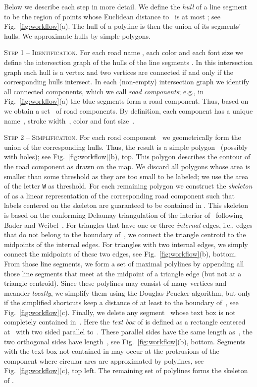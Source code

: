 \documentclass[a4paper,11pt]{article}
\begin{document}
Below we describe each step in more detail. We define the
\emph{hull} of a line segment~ to be the region of points
whose Euclidean distance to~ is at most ; see
Fig.~\ref{fig:workflow}(a). The hull of a polyline is then the union of its segments' hulls. We approximate hulls by simple polygons.

\textsc{Step 1 -- Identification.}  For each road name , each color
 and each font size  we define the intersection graph of the
hulls of the line segments . In this
intersection graph each hull is a vertex and two vertices are
connected if and only if the corresponding hulls intersect.  In each
(non-empty) intersection graph we identify all connected components,
which we call \emph{road components}; e.g., in
Fig.~\ref{fig:workflow}(a) the blue segments form a road
component. Thus, based on  we obtain a set~ of road
components. By definition, each component  has a
unique name~, stroke width~, color
 and font size~.



\textsc{Step 2 -- Simplification.} For each road component~ we geometrically form the
union of the corresponding hulls. Thus, the result is a simple
polygon~ (possibly with holes); see Fig.~\ref{fig:workflow}(b),
top. This polygon describes the contour of the road component as drawn on the map. We discard all polygons whose area is smaller
than some threshold as they are too small to be labeled; we use the
area of the letter \texttt{W} as threshold. For each remaining polygon  we
construct the \emph{skeleton} of  as a linear representation of the
corresponding road component such that labels centered on the skeleton
are guaranteed to be contained in .  This skeleton is based on the
conforming Delaunay triangulation of the interior of~ following
Bader and Weibel~\cite{Bader97}. For triangles that have one or three
\emph{internal} edges, i.e., edges that do not belong to the boundary
of~, we connect the triangle centroid to the midpoints of the
internal edges. For triangles with two internal edges, we simply
connect the midpoints of these two edges, see
Fig.~\ref{fig:workflow}(b), bottom. From those line segments, we form
a set of maximal polylines by appending all those line segments that
meet at the midpoint of a triangle edge (but not at a triangle
centroid). Since these polylines may consist of many vertices and meander \emph{locally}, we simplify them using the Douglas-Peucker
algorithm, but only if the simplified shortcuts keep a distance of at
least  to the boundary of~, see
Fig.~\ref{fig:workflow}(c).  Finally, we delete any segment~ whose
text box  is not completely contained in~. Here the \emph{text
  box}  of  is defined as a rectangle centered at~ with two
sided parallel to~. These parallel sides have the same length as~, the two orthogonal sides have length~, see
Fig.~\ref{fig:workflow}(b), bottom.  Segments with the text box not
contained in  may occur at the protrusions of the component where
circular arcs are approximated by polylines, see
Fig.~\ref{fig:workflow}(c), top left.  The remaining set of polylines
forms the skeleton of .
\end{document}

